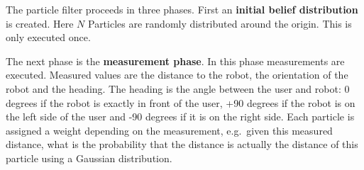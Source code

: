 \documentclass[journal]{IEEEtran}
\begin{document}
The particle filter proceeds in three phases. First an \textbf{initial belief
distribution} is created. Here $N$ Particles are randomly distributed around the
origin. This is only executed once.

The next phase is the \textbf{measurement phase}. In this phase measurements
are executed. Measured values are the distance to the robot, the orientation of
the robot and the heading. The heading is the angle between the user and robot:
0 degrees if the robot is exactly in front of the user, +90 degrees if the
robot is on the left side of the user and -90 degrees if it is on the right
side. Each particle is assigned a weight depending on the measurement, e.g.\
given this measured distance, what is the probability that the distance is
actually the distance of this particle using a Gaussian distribution.
\end{document}
